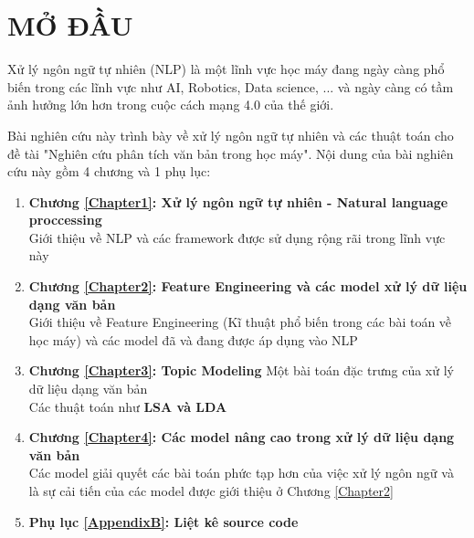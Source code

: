 
\chapter*{MỞ ĐẦU} %

\label{Chapter0} %


Xử lý ngôn ngữ tự nhiên (NLP) là một lĩnh vực học máy đang ngày càng phổ biến trong các lĩnh vực như AI, Robotics, Data science, ... và ngày càng có tầm ảnh hưởng lớn hơn trong cuộc cách mạng 4.0 của thế giới.

Bài nghiên cứu này trình bày về xử lý ngôn ngữ tự nhiên và các thuật toán cho đề tài "Nghiên cứu phân tích văn bản trong học máy". Nội dung của bài nghiên cứu này gồm 4 chương và 1 phụ lục:

\begin{enumerate}
	\item \textbf{Chương \ref{Chapter1}: Xử lý ngôn ngữ tự nhiên - Natural language proccessing}\\
	Giới thiệu về NLP và các framework được sử dụng rộng rãi trong lĩnh vực này
	\item \textbf{Chương \ref{Chapter2}: Feature Engineering và các model xử lý dữ liệu dạng văn bản}\\
	Giới thiệu về Feature Engineering (Kĩ thuật phổ biến trong các bài toán về học máy) và các model đã và đang được áp dụng vào NLP
	\item \textbf{Chương \ref{Chapter3}: Topic Modeling}
	Một bài toán đặc trưng của xử lý dữ liệu dạng văn bản \\
	Các thuật toán như \textbf{LSA và LDA}
	\item \textbf{Chương \ref{Chapter4}: Các model nâng cao trong xử lý dữ liệu dạng văn bản}\\
	Các model giải quyết các bài toán phức tạp hơn của việc xử lý ngôn ngữ và là sự cải tiến của các model được giới thiệu ở Chương \ref{Chapter2}
	\item \textbf{Phụ lục \ref{AppendixB}: Liệt kê source code} 
\end{enumerate}

